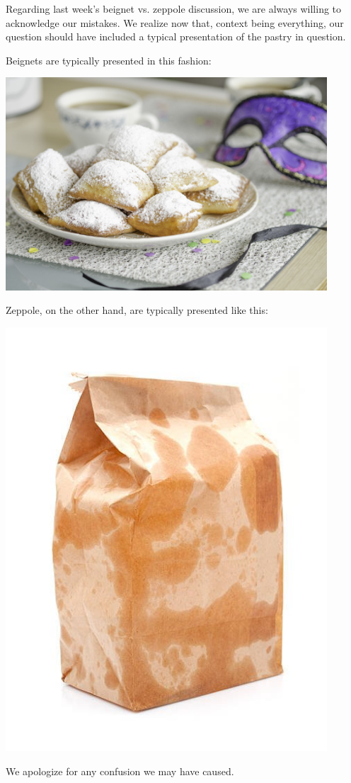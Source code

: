\documentclass[11pt]{beamer}
\begin{document}
\begingroup{}
\begin{frame}[t]{}
Regarding last week's beignet vs. zeppole discussion, we are always willing to
acknowledge our mistakes.  We realize now that, context being everything, our question
should have included a typical presentation of the pastry in question.

\medskip{}

Beignets are typically presented in this fashion:
\pause{}
\begin{center}
\includegraphics[max width=0.9\textwidth,
    max height=0.4\textheight]{Images/beignet.jpg}
\end{center}
\end{frame}
\begin{frame}[t]{}
Zeppole, on the other hand, are typically presented like this:
\pause{}
\begin{center}
\includegraphics[max width=0.9\textwidth,
    max height=0.4\textheight]{Images/zeppole.jpg}
\end{center}
\pause{}
We apologize for any confusion we may have caused.
\end{frame}
\endgroup{}
\end{document}
